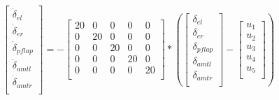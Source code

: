 \documentclass[11pt]{article}
\begin{document}
\begin{equation}
\left[
\begin{array}{c}
\dot{\delta}_{el} \\
\dot{\delta}_{er} \\
\dot{\delta}_{pflap} \\
\dot{\delta}_{amtl} \\
\dot{\delta}_{amtr} \\
\end{array}
\right] = -
\left[
\begin{array}{ccccc}
20 & 0 & 0 & 0 & 0 \\
0 & 20 & 0 & 0 & 0 \\
0 & 0 & 20 & 0 & 0 \\
0 & 0 & 0 & 20 & 0 \\
0 & 0 & 0 & 0 & 20 \\
\end{array}
\right] *
\left(
\left[
\begin{array}{c}
\delta_{el} \\
\delta_{er} \\
\delta_{pflap} \\
\delta_{amtl} \\
\delta_{amtr} \\
\end{array}
\right] -
\left[
\begin{array}{c}
u_1 \\
u_2 \\
u_3 \\
u_4 \\
u_5 \\
\end{array}
\right]
\right)
\end{equation}
\end{document}
